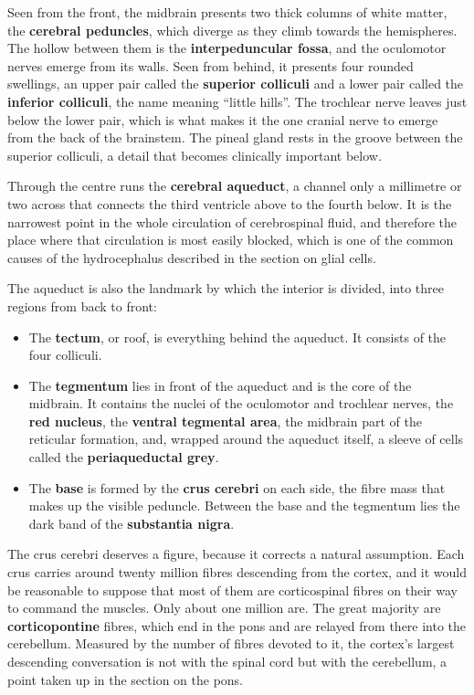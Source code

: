 \documentclass[11pt]{article}
\begin{document}
Seen from the front, the midbrain presents two thick columns of white matter, the \textbf{cerebral peduncles}, which diverge as they climb towards the hemispheres. The hollow between them is the \textbf{interpeduncular fossa}, and the oculomotor nerves emerge from its walls. Seen from behind, it presents four rounded swellings, an upper pair called the \textbf{superior colliculi} and a lower pair called the \textbf{inferior colliculi}, the name meaning ``little hills''. The trochlear nerve leaves just below the lower pair, which is what makes it the one cranial nerve to emerge from the back of the brainstem. The pineal gland rests in the groove between the superior colliculi, a detail that becomes clinically important below.

Through the centre runs the \textbf{cerebral aqueduct}, a channel only a millimetre or two across that connects the third ventricle above to the fourth below. It is the narrowest point in the whole circulation of cerebrospinal fluid, and therefore the place where that circulation is most easily blocked, which is one of the common causes of the hydrocephalus described in the section on glial cells.

The aqueduct is also the landmark by which the interior is divided, into three regions from back to front:

\begin{itemize}
    \item The \textbf{tectum}, or roof, is everything behind the aqueduct. It consists of the four colliculi.
    \item The \textbf{tegmentum} lies in front of the aqueduct and is the core of the midbrain. It contains the nuclei of the oculomotor and trochlear nerves, the \textbf{red nucleus}, the \textbf{ventral tegmental area}, the midbrain part of the reticular formation, and, wrapped around the aqueduct itself, a sleeve of cells called the \textbf{periaqueductal grey}.
    \item The \textbf{base} is formed by the \textbf{crus cerebri} on each side, the fibre mass that makes up the visible peduncle. Between the base and the tegmentum lies the dark band of the \textbf{substantia nigra}.
\end{itemize}

The crus cerebri deserves a figure, because it corrects a natural assumption. Each crus carries around twenty million fibres descending from the cortex, and it would be reasonable to suppose that most of them are corticospinal fibres on their way to command the muscles. Only about one million are. The great majority are \textbf{corticopontine} fibres, which end in the pons and are relayed from there into the cerebellum. Measured by the number of fibres devoted to it, the cortex's largest descending conversation is not with the spinal cord but with the cerebellum, a point taken up in the section on the pons.
\end{document}
